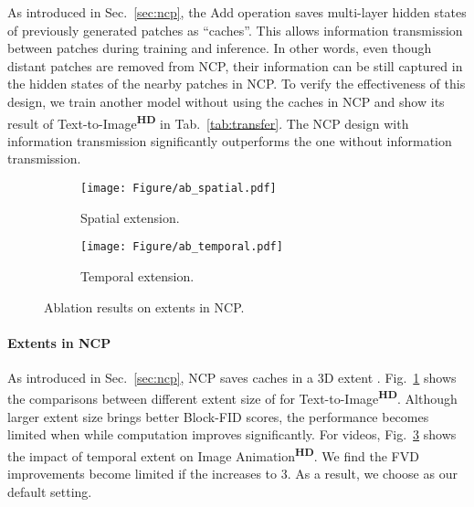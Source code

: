 \documentclass{article}
\begin{document}
As introduced in Sec.~\ref{sec:ncp}, the Add operation saves multi-layer hidden states of previously generated patches as ``caches''. 
This allows information transmission between patches during training and inference. In other words, even though distant patches are removed from NCP, their information can be still captured in the hidden states of the nearby patches in NCP. 
To verify the effectiveness of this design, we train another model without using the caches in NCP and show its result of Text-to-Image\textsuperscript{\textbf{HD}} in Tab.~\ref{tab:transfer}.
The NCP design with information transmission significantly outperforms the one without information transmission.




\begin{figure}
\centering
\begin{subfigure}[t]{0.44\textwidth}
    \centering
    \texttt{[image: Figure/ab\_spatial.pdf]}
\caption{Spatial extension.}
    \label{fig:spatialextend}
\end{subfigure}
\begin{subfigure}[t]{0.44\textwidth}
    \centering
    \texttt{[image: Figure/ab\_temporal.pdf]}
\caption{Temporal extension.}
    \label{fig:temporalextend}
\end{subfigure}
\vspace{1.5em}
\caption{Ablation results on extents in NCP.}

\vspace{-2em}
\end{figure}








\paragraph{Extents in NCP}
As introduced in Sec.~\ref{sec:ncp}, NCP saves caches in a 3D extent . Fig.~\ref{fig:spatialextend} shows the comparisons between different extent size of  for Text-to-Image\textsuperscript{\textbf{HD}}. Although larger extent size brings better Block-FID scores, the performance becomes limited when  while computation improves significantly. For videos, Fig.~\ref{fig:temporalextend} shows the impact of temporal extent on Image Animation\textsuperscript{\textbf{HD}}. We find the FVD improvements become limited if the  increases to 3. As a result, we choose  as our default setting. 
\end{document}
